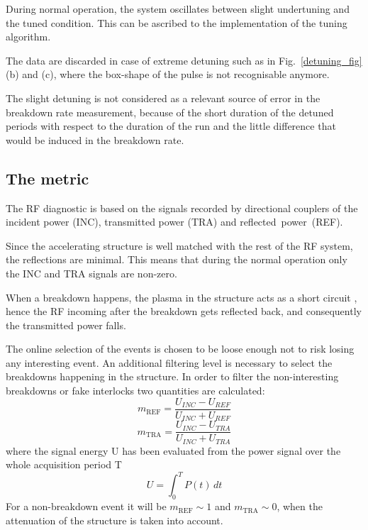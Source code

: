 During normal operation, the system oscillates between slight undertuning and the tuned condition. This can be ascribed to the implementation of the tuning algorithm.  

The data are discarded in case of extreme detuning such as in Fig.~\ref{detuning_fig} (b) and (c), where the box-shape of the pulse is not recognisable anymore.

The slight detuning is not considered as a relevant source of error in the breakdown rate measurement,  because of the short duration of the detuned periods with respect to the duration of the run and the little difference that would be induced in the breakdown rate.



\subsection[The metric]{The metric}

The RF diagnostic is based on the signals recorded by directional couplers of the incident power (INC), transmitted power (TRA) and reflected~power~(REF). 

Since the accelerating structure is well matched with the rest of the RF system, the reflections are minimal. This means that during the normal operation only the INC and TRA signals are non-zero.

When a breakdown happens, the plasma in the structure acts as a short circuit \cite{Degiovanni:2025952}, hence the RF incoming after the breakdown gets reflected back, and consequently the transmitted power falls. 

The online selection of the events is chosen to be loose enough not to risk losing any interesting event. An additional filtering level is necessary to select the breakdowns happening in the structure. In order to filter the non-interesting breakdowns or fake interlocks two quantities are calculated:
\begin{equation}
m_{\text{REF}}  =  \frac{ U_{INC} -  U_{REF}   }{  U_{INC} + U_{REF}   }
\end{equation}
\begin{equation}
m_{\text{TRA}}  =  \frac{ U_{INC} -  U_{TRA}   }{  U_{INC} +  U_{TRA}   }
\end{equation}
where the signal energy U has been evaluated from the power signal over the whole acquisition period T
\begin{equation}
U = \int_0^T P(t) \, dt
\end{equation}
For a non-breakdown event it will be $m_{\text{REF}} \sim 1$ and $m_{\text{TRA}} \sim 0$, when the attenuation of the structure is taken into account.

